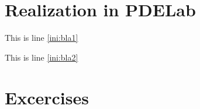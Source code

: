 \documentclass[a4paper,
		     11pt,
		     DIV12,
		     DIVcalc,
		     headings=normal,
		     oneside,
		     bibliography=totoc,
		     headsepline=false,
		     headinclude]{scrartcl}
\begin{document}
\section{Realization in PDELab}



This is line \ref{ini:bla1}

This is line \ref{ini:bla2}

\section{Excercises}



\end{document}
